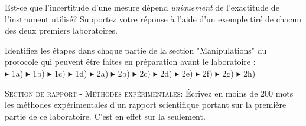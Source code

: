 \documentclass[canadien,12pt,oneside,letterpaper]{article}
\begin{document}
\begin{gradescope}
\item Est-ce que l'incertitude d'une mesure dépend \textit{uniquement} de l'exactitude de l'instrument utilisé? Supportez votre réponse à l'aide d'un exemple tiré de chacun des deux premiers laboratoires. %
\item Identifiez les étapes dans chaque partie de la section "Manipulations" du protocole qui peuvent être faites en préparation avant le laboratoire :\\ $\blacktriangleright$ 1a) $\blacktriangleright$ 1b) $\blacktriangleright$ 1c) $\blacktriangleright$ 1d) $\blacktriangleright$ 2a) $\blacktriangleright$ 2b) $\blacktriangleright$ 2c) $\blacktriangleright$ 2d) $\blacktriangleright$ 2e) $\blacktriangleright$ 2f) $\blacktriangleright$ 2g) $\blacktriangleright$ 2h) %
\item \textsc{Section de rapport - Méthodes expérimentales:} Écrivez en moins de 200 mots les méthodes expérimentales d'un rapport scientifique portant sur la première partie de ce laboratoire. C'est en effet sur la  seulement.
\end{gradescope}
\end{document}
